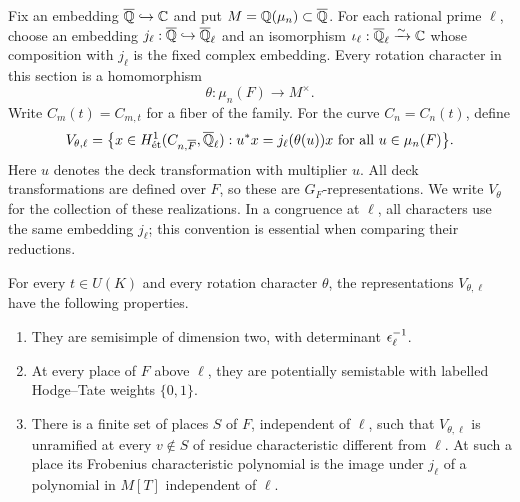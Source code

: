 Fix an embedding $\overline{\mathbb Q}\hookrightarrow\mathbb C$ and put
$M=\mathbb Q(\mu_n)\subset\overline{\mathbb Q}$.  For each rational prime $\ell$, choose
an embedding
$j_\ell:\overline{\mathbb Q}\hookrightarrow\overline{\mathbb Q}_\ell$ and an isomorphism
$\iota_\ell:\overline{\mathbb Q}_\ell\xrightarrow{\sim}\mathbb C$ whose composition
with $j_\ell$ is the fixed complex embedding.  Every rotation character
in this section is a homomorphism
\[
 \theta:\mu_n(F)\longrightarrow M^\times.
\]
Write $C_m(t)=C_{m,t}$ for a fiber of the family.  For the curve
$C_n=C_n(t)$, define
\begin{equation}\label{sys:definition}
 V_{\theta,\ell}
 =\bigl\{x\in H^1_{\mathrm{\acute et}}
       (C_{n,\overline F},\overline{\mathbb Q}_\ell):
       u^*x=j_\ell(\theta(u))x\text{ for all }u\in\mu_n(F)\bigr\}.
\end{equation}
Here $u$ denotes the deck transformation with multiplier $u$.
All deck transformations are defined over $F$, so these are
$G_F$-representations.  We write $V_\theta$ for the collection of these
realizations.  In a congruence at $\ell$, all characters use the same
embedding $j_\ell$; this convention is essential when comparing their
reductions.

\begin{proposition}\label{sys:properties}
For every $t\in U(K)$ and every rotation character $\theta$, the
representations $V_{\theta,\ell}$ have the following properties.
\begin{enumerate}
\item They are semisimple of dimension two, with determinant
$\epsilon_\ell^{-1}$.
\item At every place of $F$ above $\ell$, they are potentially
semistable with labelled Hodge--Tate weights $\{0,1\}$.
\item There is a finite set of places $S$ of $F$, independent of
$\ell$, such that $V_{\theta,\ell}$ is unramified at every
$v\notin S$ of residue characteristic different from $\ell$.
At such a place its Frobenius characteristic polynomial is the image
under $j_\ell$ of a polynomial in $M[T]$ independent of $\ell$.
\end{enumerate}
\end{proposition}

